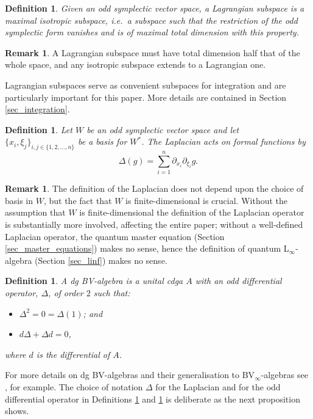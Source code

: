 \documentclass[]{amsart}
\newtheorem{definition}[theorem]{Definition}
\theoremstyle{definition}
\newtheorem{remark}[theorem]{Remark}
\newcommand{\Linf}{L$_\infty$}
\begin{document}
\begin{definition}
Given an odd symplectic vector space, a Lagrangian subspace is a maximal isotropic subspace, i.e.~a subspace such that the restriction of the odd symplectic form vanishes and is of maximal total dimension with this property.
\end{definition}

\begin{remark}
A Lagrangian subspace must have total dimension half that of the whole space, and any isotropic subspace extends to a Lagrangian one.
\end{remark}

Lagrangian subspaces serve as convenient subspaces for integration and are particularly important for this paper. More details are contained in Section \ref{sec_integration}.

\begin{definition}\label{def_BV_laplacian}
Let $W$ be an odd symplectic vector space and let $\lbrace x_i,\xi_j \rbrace_{i,j\in \lbrace 1,2,\dots, n\rbrace}$ be a basis for $W^*$. The Laplacian acts on formal functions by
\[
\Delta(g)=\sum^{n}_{i=1} \partial_{x_i} \partial_{\xi_i} g.
\]
\end{definition}

\begin{remark}
The definition of the Laplacian does not depend upon the choice of basis in $W$, but the fact that $W$ is finite-dimensional is crucial. Without the assumption that $W$ is finite-dimensional the definition of the Laplacian operator is substantially more involved, affecting the entire paper; without a well-defined Laplacian operator, the quantum master equation (Section \ref{sec_master_equations}) makes no sense, hence the definition of quantum \Linf-algebra (Section \ref{sec_linf}) makes no sense.
\end{remark}

\begin{definition}\label{def_BV_algebra}
A dg BV-algebra is a unital cdga $A$ with an odd differential operator, $\Delta$, of order $2$ such that:
\begin{itemize}
\item $\Delta^2=0=\Delta (1)$; and
\item $d\Delta + \Delta d =0$,
\end{itemize}
where $d$ is the differential of $A$.
\end{definition}

For more details on dg BV-algebras and their generalisation to BV$_\infty$-algebras see \cite{braun_laz_homotopy_BV}, for example. The choice of notation $\Delta$ for the Laplacian and for the odd differential operator in Definitions \ref{def_BV_laplacian} and \ref{def_BV_algebra} is deliberate as the next proposition shows.
\end{document}

